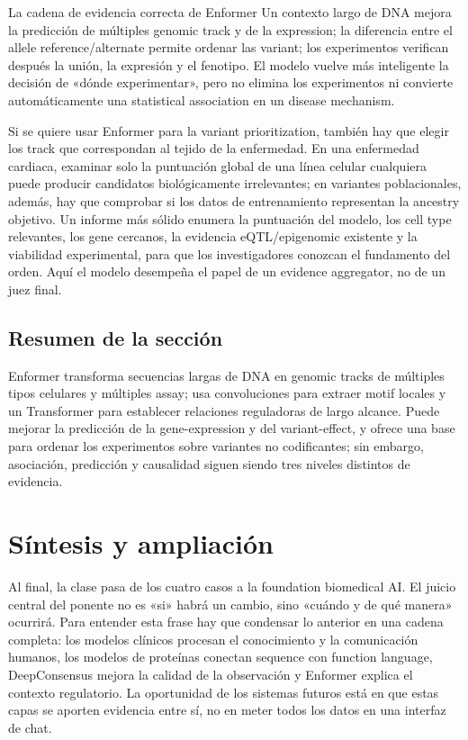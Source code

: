 \documentclass[a4paper]{article}
\begin{document}
\begin{importantbox}{La cadena de evidencia correcta de Enformer}
Un contexto largo de DNA mejora la predicción de múltiples genomic track y de la expression; la diferencia entre el allele reference/alternate permite ordenar las variant; los experimentos verifican después la unión, la expresión y el fenotipo. El modelo vuelve más inteligente la decisión de «dónde experimentar», pero no elimina los experimentos ni convierte automáticamente una statistical association en un disease mechanism.
\end{importantbox}

Si se quiere usar Enformer para la variant prioritization, también hay que elegir los track que correspondan al tejido de la enfermedad. En una enfermedad cardiaca, examinar solo la puntuación global de una línea celular cualquiera puede producir candidatos biológicamente irrelevantes; en variantes poblacionales, además, hay que comprobar si los datos de entrenamiento representan la ancestry objetivo. Un informe más sólido enumera la puntuación del modelo, los cell type relevantes, los gene cercanos, la evidencia eQTL/epigenomic existente y la viabilidad experimental, para que los investigadores conozcan el fundamento del orden. Aquí el modelo desempeña el papel de un evidence aggregator, no de un juez final.

\subsection{Resumen de la sección}

Enformer transforma secuencias largas de DNA en genomic tracks de múltiples tipos celulares y múltiples assay; usa convoluciones para extraer motif locales y un Transformer para establecer relaciones reguladoras de largo alcance. Puede mejorar la predicción de la gene-expression y del variant-effect, y ofrece una base para ordenar los experimentos sobre variantes no codificantes; sin embargo, asociación, predicción y causalidad siguen siendo tres niveles distintos de evidencia.
\section{Síntesis y ampliación}

Al final, la clase pasa de los cuatro casos a la foundation biomedical AI. El juicio central del ponente no es «si» habrá un cambio, sino «cuándo y de qué manera» ocurrirá. Para entender esta frase hay que condensar lo anterior en una cadena completa: los modelos clínicos procesan el conocimiento y la comunicación humanos, los modelos de proteínas conectan sequence con function language, DeepConsensus mejora la calidad de la observación y Enformer explica el contexto regulatorio. La oportunidad de los sistemas futuros está en que estas capas se aporten evidencia entre sí, no en meter todos los datos en una interfaz de chat.
\end{document}
